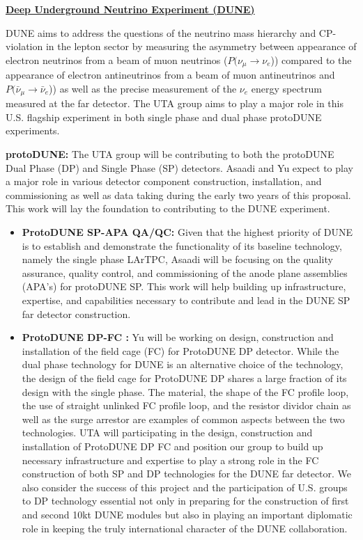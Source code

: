 \begin{center}
\underline{\textbf{Deep Underground Neutrino Experiment (DUNE)}}
\end{center}

\noindent DUNE aims to address the questions of the neutrino mass hierarchy and CP-violation in the lepton sector by measuring the asymmetry between appearance of electron neutrinos from a beam of muon neutrinos ($P(\nu_{\mu} \rightarrow \nu_{e}$)) compared to the appearance of electron antineutrinos from a beam of muon antineutrinos and $P(\bar{\nu}_{\mu} \rightarrow \bar{\nu}_{e}$)) as well as the precise measurement of the $\nu_{e}$ energy spectrum measured at the far detector. The UTA group aims to play a major role in this U.S. flagship experiment in both single phase and dual phase protoDUNE experiments.

\textbf{protoDUNE:} The UTA group will be contributing to both the protoDUNE Dual Phase (DP) and Single Phase (SP) detectors. Asaadi and Yu expect to play a major role in various detector component construction, installation, and commissioning as well as data taking during the early two years of this proposal. This work will lay the foundation to contributing to the DUNE experiment.

\begin{itemize}

\item {{\bf ProtoDUNE SP-APA QA/QC:} Given that the highest priority of DUNE is to establish and demonstrate the functionality of its baseline technology, namely the single phase LArTPC, Asaadi will be focusing on the quality assurance, quality control, and commissioning of the anode plane assemblies (APA's) for protoDUNE SP. This work will help building up infrastructure, expertise, and capabilities necessary to contribute and lead in the DUNE SP far detector construction.}

\item {{\bf ProtoDUNE DP-FC :} Yu will be working on design, construction and installation of the field cage (FC) for ProtoDUNE DP detector. While the dual phase technology for DUNE is an alternative choice of the technology, the design of the field cage for ProtoDUNE DP shares a large fraction of its design with the single phase. The material, the shape of the FC profile loop, the use of straight unlinked FC profile loop, and the resistor dividor chain as well as the surge arrestor are examples of common aspects between the two technologies.  UTA will participating in the design, construction and installation of ProtoDUNE DP FC and position our group to build up necessary infrastructure and expertise to play a strong role in the FC construction of both SP and DP technologies for the DUNE far detector.  We also consider the success of this project and the participation of U.S. groups to DP technology essential not only in preparing for the construction of first and second 10kt DUNE modules but also in playing an important diplomatic role in keeping the truly international character of the DUNE collaboration.}

\end{itemize}

